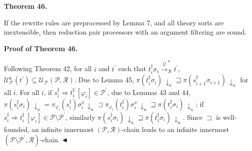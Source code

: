  
 
\par\medskip\noindent\textbf{Theorem 46.}\par
 
 
If the rewrite rules are preprocessed by Lemma 7, and all theory sorts are inextensible, then reduction pair processors with an argument filtering are sound.\par
 
 
 
 
 
\par\medskip\noindent\textbf{Proof of Theorem 46.}\par
 
 
Following Theorem 42, for all $i$ and $t^{\prime}$ such that $t_{i}^{\sharp}\sigma_{i}\xrightarrow{\scriptscriptstyle\mathcal{Q}}_{\mathcal{R}}^{*}t^{\prime}$, $\mathcal{U}_{\mathcal{F}}^{\mathfrak{a}}(t^{\prime})\subseteq\mathcal{U}_{\mathcal{F}}(\mathcal{P},\mathcal{R})$. Due to Lemma 45, $\pi(t_{i}^{\sharp}\sigma_{i})\,{\downarrow}_{\kappa}\sqsupseteq\pi(s_{i+1}^{\sharp}\sigma_{i+1})\,{\downarrow}_{\kappa}$ for all $i$. For all $i$, if ${s_{i}^{\sharp}}\Rightarrow{t_{i}^{\sharp}}\ [\varphi_{i}]\in\mathcal{P}^{\prime}$, due to Lemmas 43 and 44, $\pi(s_{i}^{\sharp}\sigma_{i})\,{\downarrow}_{\kappa}=\pi_{\varphi_{i}}(s_{i}^{\sharp})\sigma_{i}^{\pi}\,{\downarrow}_{\kappa}\sqsupset\pi_{\varphi_{i}}(t_{i}^{\sharp})\sigma_{i}^{\pi}\,{\downarrow}_{\kappa}\sqsupseteq\pi(t_{i}^{\sharp}\sigma_{i})\,{\downarrow}_{\kappa}$; if ${s_{i}^{\sharp}}\Rightarrow{t_{i}^{\sharp}}\ [\varphi_{i}]\in\mathcal{P}\setminus\mathcal{P}^{\prime}$, similarly $\pi(s_{i}^{\sharp}\sigma_{i})\,{\downarrow}_{\kappa}\sqsupseteq\pi(t_{i}^{\sharp}\sigma_{i})\,{\downarrow}_{\kappa}$. Since $\sqsupset$ is well-founded, an infinite innermost $(\mathcal{P},\mathcal{R})$-chain leads to an infinite innermost $(\mathcal{P}\setminus\mathcal{P}^{\prime},\mathcal{R})$-chain. $\hfill\blacktriangleleft$\par
 
 
 
